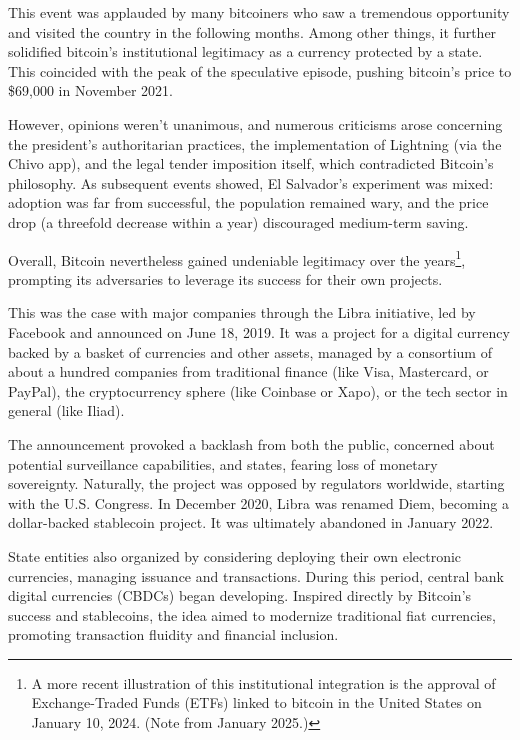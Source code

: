 \documentclass[
  a5paper,
  smalldemyvopaper,10pt,twoside,onecolumn,openright,extrafontsizes,hidelinks]{memoir}
\newlength\drop
\begin{document}
This event was applauded by many bitcoiners who saw a tremendous
opportunity and visited the country in the following months. Among other
things, it further solidified bitcoin's institutional legitimacy as a
currency protected by a state. This coincided with the peak of the
speculative episode, pushing bitcoin's price to \$69,000 in November
2021.

However, opinions weren't unanimous, and numerous criticisms arose
concerning the president's authoritarian practices, the implementation
of Lightning (via the Chivo app), and the legal tender imposition
itself, which contradicted Bitcoin's philosophy. As subsequent events
showed, El Salvador's experiment was mixed: adoption was far from
successful, the population remained wary, and the price drop (a
threefold decrease within a year) discouraged medium-term saving.

Overall, Bitcoin nevertheless gained undeniable legitimacy over the
years\footnote{A more recent illustration of this institutional
  integration is the approval of Exchange-Traded Funds (ETFs) linked to
  bitcoin in the United States on January 10, 2024. (Note from January
  2025.)}, prompting its adversaries to leverage its success for their
own projects.

This was the case with major companies through the Libra initiative, led
by Facebook and announced on June 18, 2019. It was a project for a
digital currency backed by a basket of currencies and other assets,
managed by a consortium of about a hundred companies from traditional
finance (like Visa, Mastercard, or PayPal), the cryptocurrency sphere
(like Coinbase or Xapo), or the tech sector in general (like Iliad).

The announcement provoked a backlash from both the public, concerned
about potential surveillance capabilities, and states, fearing loss of
monetary sovereignty. Naturally, the project was opposed by regulators
worldwide, starting with the U.S. Congress. In December 2020, Libra was
renamed Diem, becoming a dollar-backed stablecoin project. It was
ultimately abandoned in January 2022.

State entities also organized by considering deploying their own
electronic currencies, managing issuance and transactions. During this
period, central bank digital currencies (CBDCs) began developing.
Inspired directly by Bitcoin's success and stablecoins, the idea aimed
to modernize traditional fiat currencies, promoting transaction fluidity
and financial inclusion.
\end{document}
